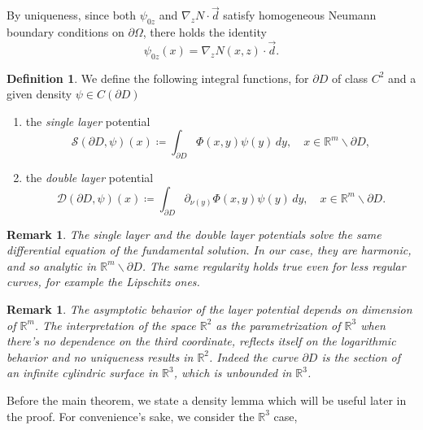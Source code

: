 \documentclass[10pt, a4paper, twoside, openright]{book}
\theoremstyle{definition}
\newtheorem{definition}[subsection]{Definition}
\theoremstyle{plain}
\theoremstyle{plain}
\theoremstyle{plain}
\theoremstyle{plain}
\newtheorem{remark}[subsection]{Remark}
\theoremstyle{plain}
\theoremstyle{plain}
\theoremstyle{plain}
\theoremstyle{plain}
\begin{document}
 By uniqueness, since both $\psi_{0z}$ and $\nabla_zN \cdot\vec{d}$ satisfy homogeneous Neumann
 boundary conditions  on $\partial \Omega$, there holds the identity
 \begin{equation}
  \psi_{0z}(x) = \nabla_zN(x,z) \cdot \vec{d}.
 \end{equation}
 \begin{definition}
 \label{def:layer-potentials}
 We define the following integral functions, for $\partial D$ of class $C^2$ and a given density $\psi\in C(\partial D)$
 \begin{enumerate}
  \item the \emph{single layer} potential
   \begin{equation}
    \mathcal{S}(\partial D,\psi)(x)\coloneqq \int_{\partial D} \Phi(x, y)\psi(y)\, dy,\quad x\in\mathbb{R}^m \backslash\partial D, \label{eq:definition-single-layer}
   \end{equation}
  \item the \emph{double layer} potential
   \begin{equation}
    \mathcal{D}(\partial D,\psi)(x)\coloneqq \int_{\partial D} \partial_{\nu(y)}\Phi(x, y)\psi(y)\, dy,\quad x\in\mathbb{R}^m \backslash\partial D. \label{eq:definition-double-layer}
   \end{equation}
 \end{enumerate}
\end{definition}
\begin{remark}
The single layer and the double layer potentials solve the same differential equation of the fundamental solution. In our case, they are harmonic, and so analytic in $\mathbb{R}^m\backslash \partial D$. The same regularity holds true even for less regular curves, for example the Lipschitz ones.
\end{remark}
\begin{remark}
\label{rem:dimension}
The asymptotic behavior of the layer potential depends on dimension of $\mathbb{R}^m$.
The interpretation of the space $\mathbb{R}^2$ as the parametrization of $\mathbb{R}^3$ 
when there's no dependence on the third coordinate, reflects itself on the logarithmic 
behavior and no uniqueness results in $\mathbb{R}^2$. Indeed the curve $\partial D$ is the section of an infinite cylindric surface in $\mathbb{R}^3$, which is unbounded in $\mathbb{R}^3$.
\end{remark}
 Before the main theorem, we state a density lemma which will be useful later in the proof. For convenience's sake, we consider the $\mathbb{R}^3$ case, 
\end{document}
